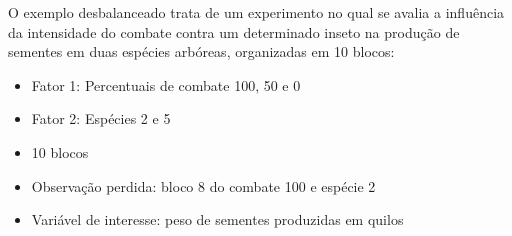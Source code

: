 \documentclass[
]{article}
\providecommand{\tightlist}{%
  \setlength{\itemsep}{0pt}\setlength{\parskip}{0pt}}
\begin{document}
O exemplo desbalanceado trata de um experimento no qual se avalia a influência da intensidade do combate contra um determinado inseto na produção de sementes em duas espécies arbóreas, organizadas em 10 blocos:

\begin{itemize}
\tightlist
\item
  Fator 1: Percentuais de combate 100, 50 e 0
\item
  Fator 2: Espécies 2 e 5
\item
  10 blocos
\item
  Observação perdida: bloco 8 do combate 100 e espécie 2
\item
  Variável de interesse: peso de sementes produzidas em quilos
\end{itemize}

\begin{table}


\end{table}
\end{document}
